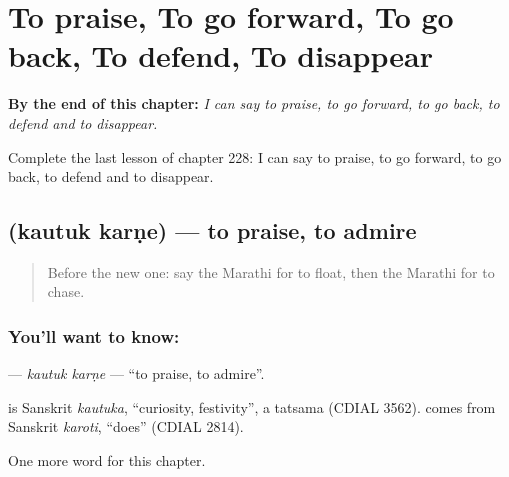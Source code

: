 
\chapter{To praise, To go forward, To go back, To defend, To disappear}
\label{ch:mr-to-praise-to-go-forward-to-go-back-to-defend-to-disappear}

\begin{chapteropening}
\textbf{By the end of this chapter:} \emph{I can say to praise, to go forward, to go back, to defend and to disappear.}

Complete the last lesson of chapter 228: I can say to praise, to go forward, to go back, to defend and to disappear.
\end{chapteropening}

\section[\texorpdfstring{\mr{कौतुक} \mr{करणे} (kautuk karṇe)}{कौतुक करणे (kautuk karṇe)}]{  (kautuk karṇe) — to praise, to admire}

\label{lesson:MR-C228-kautuk-karne}



\begin{quote}
Before the new one: say the Marathi for to float, then the Marathi for to chase.
\end{quote}

\subsection*{You'll want to know:  }
\textbf{ } — \emph{kautuk karṇe} — \textquotedblleft{}to praise, to admire\textquotedblright{}.

\begin{cousinweb}
\textbf{} is Sanskrit \emph{kautuka}, \textquotedblleft{}curiosity, festivity\textquotedblright{}, a tatsama (CDIAL 3562). \textbf{} comes from Sanskrit \emph{karoti}, \textquotedblleft{}does\textquotedblright{} (CDIAL 2814).
\end{cousinweb}

\begin{grammarlens}[title={What you've built}]
One more word for this chapter.
\end{grammarlens}

